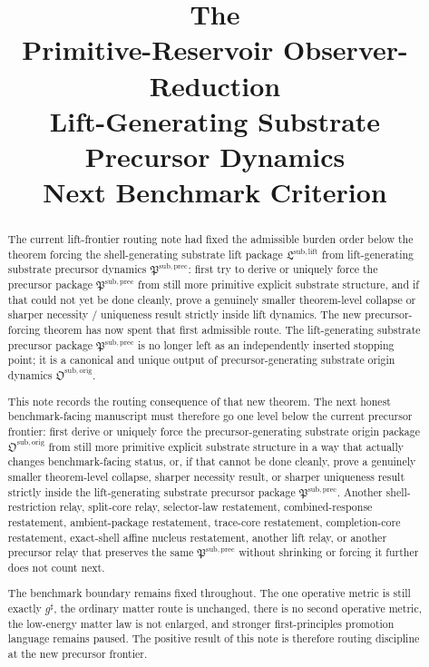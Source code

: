 \documentclass[11pt]{article}
\title{\textbf{The \TheoryName{}}\\[0.4em]
\large Primitive-Reservoir Observer-Reduction\\
\large Lift-Generating Substrate Precursor Dynamics\\
\large Next Benchmark Criterion}
\author{}
\date{}
\newcommand{\CompletedMetric}{g^{\sharp}}
\newcommand{\LiftPackage}{\mathfrak L^{\mathrm{sub,lift}}}
\newcommand{\PrecursorPackage}{\mathfrak P^{\mathrm{sub,prec}}}
\newcommand{\OriginPackage}{\mathfrak O^{\mathrm{sub,orig}}}
\begin{document}
\maketitle

\begin{abstract}
The current lift-frontier routing note had fixed the admissible burden order below the theorem forcing the shell-generating substrate lift package \(\LiftPackage\) from lift-generating substrate precursor dynamics \(\PrecursorPackage\): first try to derive or uniquely force the precursor package \(\PrecursorPackage\) from still more primitive explicit substrate structure, and if that could not yet be done cleanly, prove a genuinely smaller theorem-level collapse or sharper necessity / uniqueness result strictly inside lift dynamics. The new precursor-forcing theorem has now spent that first admissible route. The lift-generating substrate precursor package \(\PrecursorPackage\) is no longer left as an independently inserted stopping point; it is a canonical and unique output of precursor-generating substrate origin dynamics \(\OriginPackage\).

This note records the routing consequence of that new theorem. The next honest benchmark-facing manuscript must therefore go one level below the current precursor frontier: first derive or uniquely force the precursor-generating substrate origin package \(\OriginPackage\) from still more primitive explicit substrate structure in a way that actually changes benchmark-facing status, or, if that cannot be done cleanly, prove a genuinely smaller theorem-level collapse, sharper necessity result, or sharper uniqueness result strictly inside the lift-generating substrate precursor package \(\PrecursorPackage\). Another shell-restriction relay, split-core relay, selector-law restatement, combined-response restatement, ambient-package restatement, trace-core restatement, completion-core restatement, exact-shell affine nucleus restatement, another lift relay, or another precursor relay that preserves the same \(\PrecursorPackage\) without shrinking or forcing it further does not count next.

The benchmark boundary remains fixed throughout. The one operative metric is still exactly \(\CompletedMetric\), the ordinary matter route is unchanged, there is no second operative metric, the low-energy matter law is not enlarged, and stronger first-principles promotion language remains paused. The positive result of this note is therefore routing discipline at the new precursor frontier.
\end{abstract}
\end{document}
